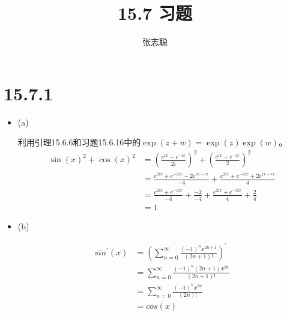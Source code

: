 \documentclass{article}
\begin{document}
\title{15.7 习题}
\author{张志聪}
\maketitle

\section*{15.7.1}

\begin{itemize}
  \item (a)

        利用引理15.6.6和习题15.6.16中的$\exp(z + w) = \exp(z)\exp(w)$。
        \begin{align*}
          \sin(x)^2 + \cos(x)^2
           & = \left(\frac{e^{ix} - e^{-ix}}{2i}\right)^2 + \left(\frac{e^{ix} + e^{-ix}}{2}\right)^2       \\
           & = \frac{e^{2ix} + e^{-2ix} - 2 e^{ix - ix}}{-4} + \frac{e^{2ix} + e^{-2ix} + 2 e^{ix - ix}}{4} \\
           & = \frac{e^{2ix} + e^{-2ix}}{-4} + \frac{-2}{-4} + \frac{e^{2ix} + e^{-2ix}}{4} + \frac{2}{4}   \\
           & = 1
        \end{align*}
  \item (b)

        \begin{align*}
          sin^\prime(x) & = \left(\sum\limits_{n = 0}^\infty \frac{(-1)^nx^{2n + 1}}{(2n + 1)!} \right)^\prime \\
                        & = \sum\limits_{n = 0}^\infty \frac{(-1)^n(2n + 1)x^{2n}}{(2n + 1)!}                  \\
                        & = \sum\limits_{n = 0}^\infty \frac{(-1)^nx^{2n}}{(2n)!}                              \\
                        & = cos(x)
        \end{align*}


\end{itemize}
\end{document}
